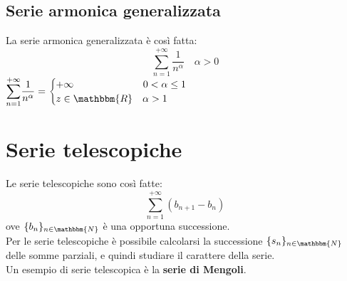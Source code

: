 \documentclass[12pt]{report}
\begin{document}
 		\subsection{Serie armonica generalizzata}
 		La serie armonica generalizzata è così fatta:
 		\[
 		\sum_{n=1}^{+\infty}\frac{1}{n^\alpha} \quad \alpha > 0
 		\]
 		$\mathlarger{\sum_{n=1}^{+\infty}}\dfrac{1}{n^\alpha} = \begin{cases}
 			+\infty\phantom{\mathbbm{R}}\quad 0 < \alpha \leq 1 \\
 			z \in \mathbbm{R} \quad \alpha > 1
 		\end{cases}$
 		\section{Serie telescopiche}
 		Le serie telescopiche sono così fatte:
 		\[
 		\sum_{n=1}^{+\infty}(b_{n+1} - b_n)
 		\]
 		ove $\{b_n\}_{n\in\mathbbm{N}}$ è una opportuna successione. \\
 		Per le serie telescopiche è possibile calcolarsi la successione $\{s_n\}_{n\in \mathbbm{N}}$ delle somme parziali, e quindi studiare il carattere della serie. \\
 		Un esempio di serie telescopica è la \textbf{serie di Mengoli}.
\end{document}
